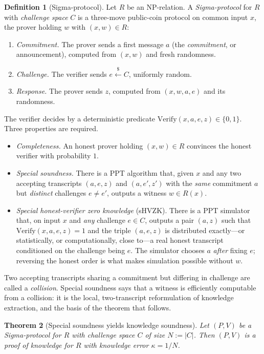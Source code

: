 \documentclass[11pt,a4paper]{article}
\newtheorem{theorem}{Theorem}[section]
\theoremstyle{definition}
\newtheorem{definition}[theorem]{Definition}
\theoremstyle{remark}
\providecommand{\abs}[1]{\lvert #1 \rvert}
\begin{document}
\begin{definition}[Sigma-protocol]\label{zk:def:sigma}
Let \(R\) be an NP-relation. A \emph{Sigma-protocol} for \(R\) with
\emph{challenge space} \(C\) is a three-move public-coin protocol on
common input \(x\), the prover holding \(w\) with \((x, w) \in R\):
\begin{enumerate}
\item \emph{Commitment.} The prover sends a first message \(a\)
  (the \emph{commitment}, or announcement), computed from
  \((x, w)\) and fresh randomness.
\item \emph{Challenge.} The verifier sends
  \(e \xleftarrow{\$} C\), uniformly random.
\item \emph{Response.} The prover sends \(z\), computed from
  \((x, w, a, e)\) and its randomness.
\end{enumerate}
The verifier decides by a deterministic predicate
\(\mathrm{Verify}(x, a, e, z) \in \{0, 1\}\). Three properties are
required.
\begin{itemize}
\item \emph{Completeness.} An honest prover holding
  \((x, w) \in R\) convinces the honest verifier with probability
  \(1\).
\item \emph{Special soundness.} There is a PPT algorithm that, given
  \(x\) and any two accepting transcripts \((a, e, z)\) and
  \((a, e', z')\) with the \emph{same} commitment \(a\) but
  \emph{distinct} challenges \(e \ne e'\), outputs a witness
  \(w \in R(x)\).
\item \emph{Special honest-verifier zero knowledge} (sHVZK). There
  is a PPT simulator that, on input \(x\) and \emph{any} challenge
  \(e \in C\), outputs a pair \((a, z)\) such that
  \(\mathrm{Verify}(x, a, e, z) = 1\) and the triple \((a, e, z)\)
  is distributed exactly---or statistically, or computationally,
  close to---a real honest transcript conditioned on the challenge
  being \(e\). The simulator chooses \(a\) \emph{after} fixing
  \(e\); reversing the honest order is what makes simulation
  possible without \(w\).
\end{itemize}
Two accepting transcripts sharing a commitment but differing in
challenge are called a \emph{collision}. Special soundness says that a
witness is efficiently computable from a collision: it is the local,
two-transcript reformulation of knowledge extraction, and the basis of
the theorem that follows.
\end{definition}

\begin{theorem}[Special soundness yields knowledge soundness]
\label{zk:thm:special}
Let \((P, V)\) be a Sigma-protocol for \(R\) with challenge space
\(C\) of size \(N := \abs{C}\). Then \((P, V)\) is a proof of
knowledge for \(R\) with knowledge error \(\kappa = 1/N\).
\end{theorem}
\end{document}
